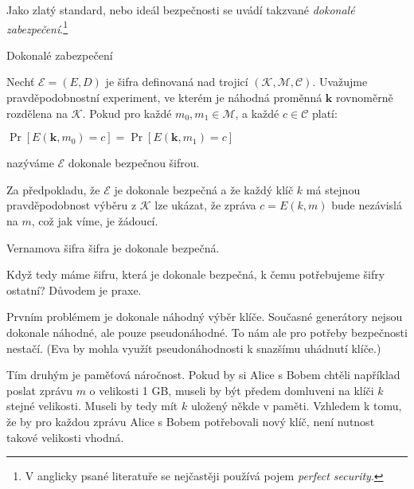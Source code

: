 \documentclass[
  program=infoi,
  biblatex,
  figures=false,
  glossaries,
  index
]{kidiplom}
\begin{document}
        Jako zlatý standard, nebo ideál bezpečnosti se uvádí takzvané \emph{dokonalé zabezpečení}.\footnote{V anglicky psané
        literatuře se nejčastěji používá pojem \emph{perfect security}.}


        \begin{definition}
            Dokonalé zabezpečení

            Nechť $\mathcal{E}=(E, D)$ je šifra definovaná nad trojicí $(\mathcal{K},\mathcal{M},\mathcal{C})$.
            Uvažujme pravděpodobnostní experiment, ve kterém je náhodná proměnná $\textbf{k}$ rovnoměrně rozdělena na $\mathcal{K}$.
            Pokud pro každé $m_0, m_1 \in \mathcal{M}$, a každé $c \in \mathcal{C}$ platí:

            \medskip
            $\Pr[E(\textbf{k},m_0) = c] = \Pr[E(\textbf{k},m_1) = c]$

            \medskip
            nazýváme $\mathcal{E}$ dokonale bezpečnou šifrou.
        \end{definition}

        Za předpokladu, že $\mathcal{E}$ je dokonale bezpečná a že každý klíč $k$ má stejnou pravděpodobnost
        výběru z $\mathcal{K}$ lze ukázat, že zpráva $c = E(k, m)$ bude nezávislá na $m$, což jak víme, je žádoucí.


        \begin{theorem}
            Vernamova šifra šifra je dokonale bezpečná.
        \end{theorem}


        \medskip
        
        Když tedy máme šifru, která je dokonale bezpečná, k čemu potřebujeme šifry ostatní? Důvodem je praxe.

        Prvním problémem je dokonale náhodný výběr klíče. Současné generátory nejsou dokonale náhodné, ale pouze pseudonáhodné.
        To nám ale pro potřeby bezpečnosti nestačí. (Eva by mohla využít pseudonáhodnosti k snazšímu uhádnutí klíče.)

        Tím druhým je paměťová náročnost. Pokud by si Alice s Bobem chtěli například poslat zprávu $m$ o velikosti 1 GB, museli by být předem
        domluveni na klíči $k$ stejné velikosti. Museli by tedy mít $k$ uložený někde v paměti. Vzhledem k tomu, že by
        pro každou zprávu Alice s Bobem potřebovali nový klíč, není nutnost takové velikosti vhodná.
\end{document}
